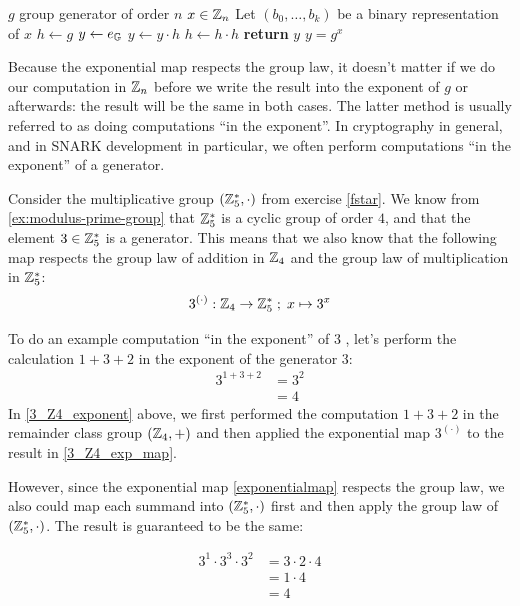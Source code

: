 \begin{algorithm}\caption{Cyclic Group Exponentiation}
\label{alg_square-and-mul}
\begin{algorithmic}[0]
\Require $g$ group generator of order $n$
\Require $x \in \mathbb{Z}_n$ 
\State Let $(b_0,\ldots,b_k)$ be a binary representation of $x$ 
\State $h \gets g$
\State $y \gets e_{\mathbb{G}}$
		\State $y\gets y\cdot h$ 
	\EndIf
	\State $h \gets h\cdot h$ 
\EndFor
\State \textbf{return} $y$
\EndProcedure
\Ensure $ y = g^x$
\end{algorithmic}
\end{algorithm}

Because the exponential map respects the group law, it doesn't matter if we do our computation in $\mathbb{Z}_n$ before we write the result into the exponent of $g$ or afterwards: the result will be the same in both cases. The latter method is usually referred to as doing computations ``in the exponent''. In cryptography in general, and in SNARK development in particular, we often perform computations ``in the exponent'' of a generator.
\begin{example}\label{ex:in-the-exponent} Consider the multiplicative group $(\mathbb{Z}_{5}^*,\cdot)$ from exercise \ref{fstar}. We know from \exercisename{} \ref{ex:modulus-prime-group} that $\mathbb{Z}_{5}^*$ is a cyclic group of order $4$, and that the element $3\in\mathbb{Z}_5^*$ is a generator. This means that we also know that the following map respects the group law of addition in $\mathbb{Z}_4$ and the group law of multiplication in $\mathbb{Z}_5^*$:
$$
3^{(\cdot)}: \mathbb{Z}_4 \to \mathbb{Z}_5^* \;;\; x \mapsto 3^x
$$

To do an example computation ``in the exponent'' of $3$ , let's perform the calculation  $1+3+2$ in the exponent of the generator $3$:
\begin{align}
3^{1+3+2} &=3^{2}\label{3_Z4_exponent}\\
          & = 4\label{3_Z4_exp_map}
\end{align}
In \eqref{3_Z4_exponent} above, we first performed the computation $1+3+2$ in the remainder class group $(\mathbb{Z}_4,+)$ and then applied the exponential map $3^{(\cdot)}$ to the result in \eqref{3_Z4_exp_map}. 

However, since the exponential map \eqref{exponentialmap} respects the group law, we also could map each summand into $(\mathbb{Z}_5^*,\cdot)$ first and then apply the group law of $(\mathbb{Z}_5^*,\cdot)$. The result is guaranteed to be the same:

\begin{align*}
3^1 \cdot 3^3 \cdot 3^{2}
          & = 3\cdot 2 \cdot 4\\
          & = 1\cdot 4\\
          & = 4
\end{align*}
\end{example}

